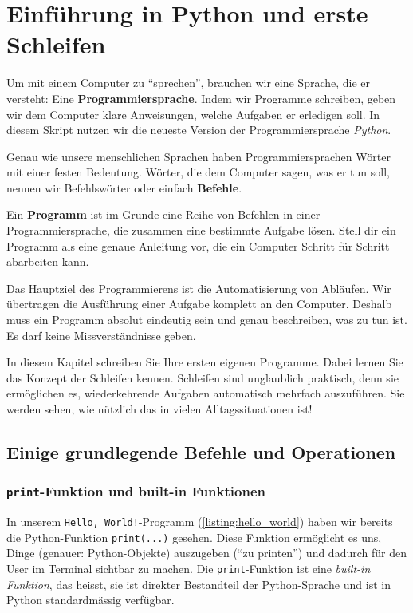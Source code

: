 \chapter{Einführung in Python und erste Schleifen}\label{ch:K02_Intro}


Um mit einem Computer zu \enquote{sprechen}, brauchen wir eine Sprache, die er versteht: Eine \textbf{Programmiersprache}. Indem wir Programme schreiben, geben wir dem Computer klare Anweisungen, welche Aufgaben er erledigen soll. In diesem Skript nutzen wir die neueste Version der Programmiersprache \emph{Python}.

Genau wie unsere menschlichen Sprachen haben Programmiersprachen Wörter mit einer festen Bedeutung. Wörter, die dem Computer sagen, was er tun soll, nennen wir Befehlswörter oder einfach \textbf{Befehle}.

Ein \textbf{Programm} ist im Grunde eine Reihe von Befehlen in einer Programmiersprache, die zusammen eine bestimmte Aufgabe lösen. Stell dir ein Programm als eine genaue Anleitung vor, die ein Computer Schritt für Schritt abarbeiten kann.

Das Hauptziel des Programmierens ist die Automatisierung von Abläufen. Wir übertragen die Ausführung einer Aufgabe komplett an den Computer. Deshalb muss ein Programm absolut eindeutig sein und genau beschreiben, was zu tun ist. Es darf keine Missverständnisse geben.

In diesem Kapitel schreiben Sie Ihre ersten eigenen Programme. Dabei lernen Sie das Konzept der Schleifen kennen. Schleifen sind unglaublich praktisch, denn sie ermöglichen es, wiederkehrende Aufgaben automatisch mehrfach auszuführen. Sie werden sehen, wie nützlich das in vielen Alltagssituationen ist!

\section{Einige grundlegende Befehle und Operationen}

\subsection{\texorpdfstring{\lstinline|print|}{print}-Funktion und built-in Funktionen}
In unserem \texttt{Hello, World!}-Programm (\cref{listing:hello_world}) haben wir bereits die Python-Funktion \lstinline|print(...)| gesehen.
Diese Funktion ermöglicht es uns, Dinge (genauer: Python-Objekte) auszugeben (\enquote{zu printen}) und dadurch für den User im Terminal sichtbar zu machen. Die \lstinline|print|-Funktion ist eine \emph{built-in Funktion}, das heisst, sie ist direkter Bestandteil der Python-Sprache und ist in Python standardmässig verfügbar.

